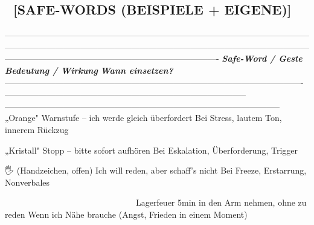 {{\subsection{🔑 \textbf{[SAFE-WORDS (BEISPIELE + EIGENE)]}}

----------------------------------------------------------------------------------------------------------------------------------------------------------------------------------------------------------------------------------------------------------------------------------------------------
\textbf{\textit{Safe-Word / Geste}}                                                                                    \textbf{\textit{Bedeutung / Wirkung}}                                                              \textbf{\textit{Wann einsetzen?}}
---------------------------------------------------------------------------------------------------------- -------------------------------------------------------------------------------------- --------------------------------------------------------------------------------------------------
„Orange"                                                                                                   Warnstufe -- ich werde gleich überfordert                                              Bei Stress, lautem Ton, innerem Rückzug

„Kristall"                                                                                                 Stopp -- bitte sofort aufhören                                                         Bei Eskalation, Überforderung, \textcolor{ctmmRed}{Trigger}

🖐️ (Handzeichen, offen)                                                                                    Ich will reden, aber schaff's nicht                                                    Bei Freeze, Erstarrung, Nonverbales

\textcolor{ctmmBlue}{}                                     Lagerfeuer                                                          \textcolor{ctmmBlue}{} 5min in den Arm nehmen, ohne zu reden                                               \textcolor{ctmmBlue}{} Wenn ich Nähe brauche (Angst, Frieden in einem Moment)

}}
